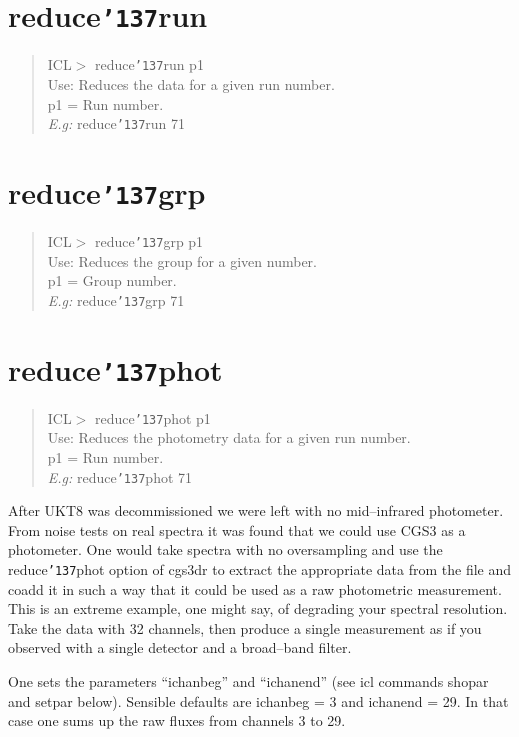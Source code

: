 \documentclass[a4paper]{book}
\renewcommand{\_}{{\tt\char'137}}
\begin{document}
\section{reduce\_run}
\begin{quote}
ICL$>$ reduce\_run p1 \\
Use: Reduces the data for a given run number. \\
p1 = Run number. \\
{\em E.g:} reduce\_run 71
\end{quote}

\section{reduce\_grp}
\begin{quote}
ICL$>$ reduce\_grp p1 \\
Use: Reduces the group for a given number. \\
p1 = Group number. \\
{\em E.g:} reduce\_grp 71
\end{quote}

\section{reduce\_phot}
\begin{quote}
ICL$>$ reduce\_phot p1 \\
Use: Reduces the photometry data for a given run number. \\
p1 = Run number. \\
{\em E.g:} reduce\_phot 71
\end{quote}

After UKT8 was decommissioned we were left with no mid--infrared
photometer.  From noise tests on real spectra it was found that we
could use CGS3 as a photometer.  One would take spectra with no
oversampling and use the reduce\_phot option of cgs3dr to extract
the appropriate data from the file and coadd it in such a way that it
could be used as a raw photometric measurement.  This is an extreme
example, one might say, of degrading your spectral resolution.  Take
the data with 32 channels, then produce a single measurement as if
you observed with a single detector and a broad--band filter.

One sets the parameters
``ichanbeg'' and ``ichanend'' (see icl commands shopar and setpar below).
Sensible defaults are ichanbeg = 3 and ichanend = 29.  In that case one
sums up the raw fluxes from channels 3 to 29.
\end{document}
